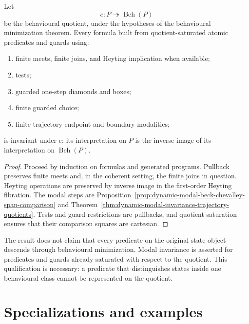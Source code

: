 \begin{corollary}
\label{cor:dynamic-behavioural-invariance-descended-formulas}
Let
\[
    e:P\twoheadrightarrow\operatorname{Beh}(P)
\]
be the behavioural quotient, under the hypotheses of the behavioural
minimization theorem.  Every formula built from quotient-saturated atomic
predicates and guards using:

\begin{enumerate}
\item finite meets, finite joins, and Heyting implication when available;
\item tests;
\item guarded one-step diamonds and boxes;
\item finite guarded choice;
\item finite-trajectory endpoint and boundary modalities;
\end{enumerate}

is invariant under \(e\): its interpretation on \(P\) is the inverse image of
its interpretation on \(\operatorname{Beh}(P)\).
\end{corollary}

\begin{proof}
Proceed by induction on formulas and generated programs.  Pullback preserves
finite meets and, in the coherent setting, the finite joins in question.
Heyting operations are preserved by inverse image in the first-order Heyting
fibration.  The modal steps are
Proposition~\ref{prop:dynamic-modal-beck-chevalley-span-comparison} and
Theorem~\ref{thm:dynamic-modal-invariance-trajectory-quotients}.  Tests and
guard restrictions are pullbacks, and quotient saturation ensures that their
comparison squares are cartesian.
\end{proof}

\begin{remark}
\label{rem:dynamic-no-automatic-predicate-descent}
The result does not claim that every predicate on the original state object
descends through behavioural minimization.  Modal invariance is asserted for
predicates and guards already saturated with respect to the quotient.  This
qualification is necessary: a predicate that distinguishes states inside one
behavioural class cannot be represented on the quotient.
\end{remark}


\section{Specializations and examples}
\label{sec:dynamic-specializations-examples}


